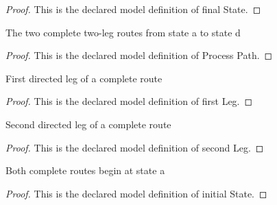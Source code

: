 \begin{proof}
  This is the declared model definition of final State.
\end{proof}
\begin{definition}
  \label{def:physics:phyx-mini-0471:phyxminiproblems-problemphyxmini0471-processpath}
  The two complete two-leg routes from state a to state d
\end{definition}
\begin{proof}
  This is the declared model definition of Process Path.
\end{proof}
\begin{definition}
  \label{def:physics:phyx-mini-0471:phyxminiproblems-problemphyxmini0471-processpath-firstleg}
  First directed leg of a complete route
\end{definition}
\begin{proof}
  This is the declared model definition of first Leg.
\end{proof}
\begin{definition}
  \label{def:physics:phyx-mini-0471:phyxminiproblems-problemphyxmini0471-processpath-secondleg}
  Second directed leg of a complete route
\end{definition}
\begin{proof}
  This is the declared model definition of second Leg.
\end{proof}
\begin{definition}
  \label{def:physics:phyx-mini-0471:phyxminiproblems-problemphyxmini0471-processpath-initialstate}
  Both complete routes begin at state a
\end{definition}
\begin{proof}
  This is the declared model definition of initial State.
\end{proof}
